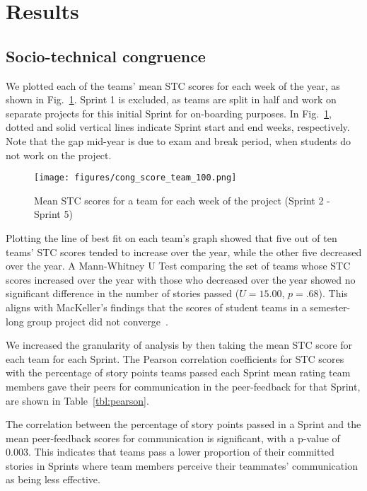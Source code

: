 \section{Results}
\label{results}
\subsection{Socio-technical congruence}
We plotted each of the teams' mean STC scores for each week of the year, as shown in Fig.~\ref{fig:congruence_over_year}. Sprint 1 is excluded, as teams are split in half and work on separate projects for this initial Sprint for on-boarding purposes. In Fig.~\ref{fig:congruence_over_year}, dotted and solid vertical lines indicate Sprint start and end weeks, respectively. Note that the gap mid-year is due to exam and break period, when students do not work on the project.

\begin{figure}[ht]
    \centering
    \texttt{[image: figures/cong\_score\_team\_100.png]}
    \caption{Mean STC scores for a team for each week of the project (Sprint 2 - Sprint 5)}
    \label{fig:congruence_over_year}
\end{figure}

Plotting the line of best fit on each team's graph showed that five out of ten teams' STC scores tended to increase over the year, while the other five decreased over the year. A Mann-Whitney U Test comparing the set of teams whose STC scores increased over the year with those who decreased over the year showed no significant difference in the number of stories passed ($U = 15.00$, $p = .68$). This aligns with MacKeller's findings that the scores of student teams in a semester-long group project did not converge~\cite{b.k.mackellarAnalyzingCoordinationStudents2013}. 


We increased the granularity of analysis by then taking the mean STC score for each team for each Sprint. The Pearson correlation coefficients for STC scores with the percentage of story points teams passed each Sprint mean rating team members gave their peers for communication in the peer-feedback for that Sprint, are shown in Table~\ref{tbl:pearson}. 



The correlation between the percentage of story points passed in a Sprint and the mean peer-feedback scores for communication is significant, with a p-value of 0.003. This indicates that teams pass a lower proportion of their committed stories in Sprints where team members perceive their teammates' communication as being less effective.

